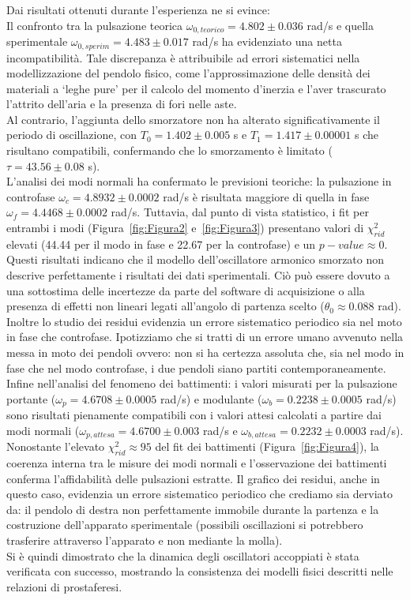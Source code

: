 \documentclass[a4paper,12pt]{article}
\begin{document}
Dai risultati ottenuti durante l'esperienza ne si evince:
\\
Il confronto tra la pulsazione teorica $\omega_{0, teorico} = 4.802 \pm 0.036$ rad/s e quella sperimentale $\omega_{0, sperim} = 4.483 \pm 0.017$ rad/s ha evidenziato una netta incompatibilità. Tale discrepanza è attribuibile ad errori sistematici nella modellizzazione del pendolo fisico, come l'approssimazione delle densità dei materiali a `leghe pure' per il calcolo del momento d'inerzia e l'aver trascurato l'attrito dell'aria e la presenza di fori nelle aste.
\\
Al contrario, l'aggiunta dello smorzatore non ha alterato significativamente il periodo di oscillazione, con $T_0 = 1.402 \pm 0.005$ s e $T_1 = 1.417 \pm 0.00001$ s che risultano compatibili, confermando che lo smorzamento è limitato ($\tau = 43.56 \pm 0.08$ s).  
\\
L'analisi dei modi normali ha confermato le previsioni teoriche: la pulsazione in controfase $\omega_c = 4.8932 \pm 0.0002$ rad/s è risultata maggiore di quella in fase $\omega_f = 4.4468 \pm 0.0002$ rad/s. Tuttavia, dal punto di vista statistico, i fit per entrambi i modi (Figura~\ref{fig:Figura2} e~\ref{fig:Figura3}) presentano valori di $\chi^2_{rid}$ elevati (44.44 per il modo in fase e 22.67 per la controfase) e un $p-value \approx 0$. Questi risultati indicano che il modello dell'oscillatore armonico smorzato non descrive perfettamente i risultati dei dati sperimentali. Ciò può essere dovuto a una sottostima delle incertezze da parte del software di acquisizione o alla presenza di effetti non lineari legati all'angolo di partenza scelto ($\theta_0 \approx 0.088$ rad).
Inoltre lo studio dei residui evidenzia un errore sistematico periodico sia nel moto in fase che controfase. Ipotizziamo che si tratti di un errore umano avvenuto nella messa in moto dei pendoli ovvero: non si ha certezza assoluta che, sia nel modo in fase che nel modo controfase, i due pendoli siano partiti contemporaneamente.
\\
Infine nell'analisi del fenomeno dei battimenti: i valori misurati per la pulsazione portante ($\omega_p = 4.6708 \pm 0.0005$ rad/s) e modulante ($\omega_b = 0.2238 \pm 0.0005$ rad/s) sono risultati pienamente compatibili con i valori attesi calcolati a partire dai modi normali ($\omega_{p, attesa} = 4.6700 \pm 0.003$ rad/s e $\omega_{b, attesa} = 0.2232 \pm 0.0003$ rad/s).
Nonostante l'elevato $\chi^2_{rid} \approx 95$ del fit dei battimenti (Figura~\ref{fig:Figura4}), la coerenza interna tra le misure dei modi normali e l'osservazione dei battimenti conferma l'affidabilità delle pulsazioni estratte. 
Il grafico dei residui, anche in questo caso, evidenzia un errore sistematico periodico che crediamo sia derviato da: il pendolo di destra non perfettamente immobile durante la partenza e la costruzione dell'apparato sperimentale (possibili oscillazioni si potrebbero trasferire attraverso l'apparato e non mediante la molla).
\\
Si è quindi dimostrato che la dinamica degli oscillatori accoppiati è stata verificata con successo, mostrando la consistenza dei modelli fisici descritti nelle relazioni di prostaferesi.
\end{document}
